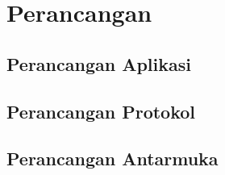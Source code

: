 \chapter{Perancangan}
\label{chap:perancangan}

\section{Perancangan Aplikasi}

\section{Perancangan Protokol}

\section{Perancangan Antarmuka}
